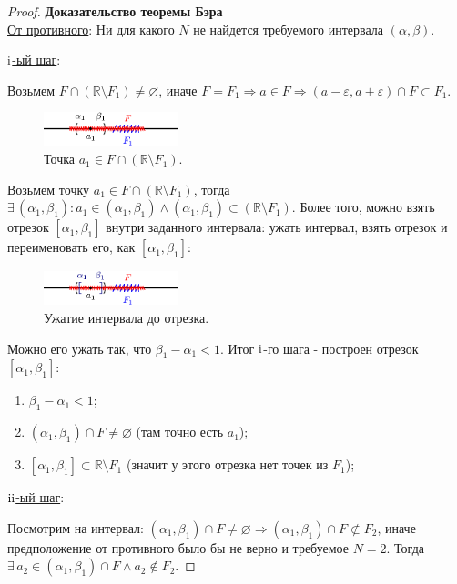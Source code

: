 \documentclass[12pt]{article}
\newcommand{\RN}[1]{%
	\textup{\uppercase\expandafter{\romannumeral#1}}%
}
\theoremstyle{definition}
\begin{document}
\begin{proof}\textbf{Доказательство теоремы Бэра}\\
	\uline{От противного}: Ни для какого $N$ не найдется требуемого интервала $(\alpha, \beta)$.
	
	\uline{$\RN{1}$-ый шаг}:
	
	Возьмем $F \cap (\mathbb{R} \setminus F_1) \neq \varnothing$, иначе $F = F_1 \Rightarrow a \in F \Rightarrow (a-\varepsilon, a + \varepsilon) \cap F \subset F_1$.
	
	\begin{figure}[H]
		\centering
		\includegraphics[width=0.35\textwidth]{13_1.eps}
		\caption{Точка $a_1 \in F \cap (\mathbb{R} \setminus F_1)$.}
		\label{13_1}
	\end{figure}
	
	Возьмем точку $a_1 \in F \cap (\mathbb{R} \setminus F_1)$, тогда $\exists \, (\alpha_1,\beta_1) \colon a_1 \in (\alpha_1,\beta_1) \wedge (\alpha_1,\beta_1) \subset (\mathbb{R}\setminus F_1)$. Более того, можно взять отрезок $[\alpha_1,\beta_1]$ внутри заданного интервала: ужать интервал, взять отрезок и переименовать его, как $[\alpha_1,\beta_1]$:
	
	\begin{figure}[H]
		\centering
		\includegraphics[width=0.35\textwidth]{13_2.eps}
		\caption{Ужатие интервала до отрезка.}
		\label{13_2}
	\end{figure}
	
	Можно его ужать так, что $\beta_1 - \alpha_1 < 1$. Итог $\RN{1}$-го шага - построен отрезок $[\alpha_1,\beta_1]$:
	\begin{enumerate}[label={\arabic*)}]
		\item $\beta_1 - \alpha_1 < 1$;
		\item $(\alpha_1, \beta_1) \cap F \neq \varnothing$ (там точно есть $a_1$);
		\item $[\alpha_1, \beta_1] \subset \mathbb{R} \setminus F_1$ (значит у этого отрезка нет точек из $F_1$);
	\end{enumerate}

	\uline{$\RN{2}$-ый шаг}:
	
	Посмотрим на интервал: $(\alpha_1, \beta_1) \cap F \neq \varnothing \Rightarrow (\alpha_1, \beta_1) \cap F \not\subset F_2$, иначе предположение от противного было бы не верно и требуемое $N = 2$. 
	Тогда $\exists \, a_2 \in (\alpha_1,\beta_1) \cap F \wedge a_2 \notin F_2$. 
	

\end{proof}
\end{document}
